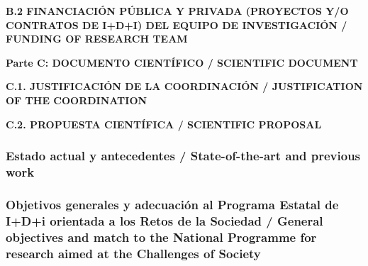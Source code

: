 \documentclass[a4paper,11pt,oneside]{article}
\begin{document}
\noindent\textbf{B.2 FINANCIACIÓN PÚBLICA Y PRIVADA (PROYECTOS Y/O CONTRATOS DE I+D+I) DEL EQUIPO DE INVESTIGACIÓN / FUNDING OF RESEARCH TEAM}
\vspace{12pt}


\newpage
\setcounter{page}{1}



\begin{tcolorbox}[colback=yellow,arc=0pt,outer arc=0pt,colframe=black,boxrule=0.6pt,left=0mm]
  \noindent\textbf{Parte C: DOCUMENTO CIENTÍFICO / SCIENTIFIC DOCUMENT}
\end{tcolorbox}

\vspace{12pt}

\noindent\textbf{C.1. JUSTIFICACIÓN DE LA COORDINACIÓN / JUSTIFICATION OF THE COORDINATION}
\vspace{12pt}



\vspace{12pt}

\noindent\textbf{C.2. PROPUESTA CIENTÍFICA / SCIENTIFIC PROPOSAL}

\subsubsection*{\label{subsubsec:stateoftheart}Estado actual y antecedentes /  State-of-the-art and previous work}




\subsubsection*{Objetivos generales y adecuación al Programa Estatal de I+D+i orientada a los Retos de la Sociedad / General objectives and match to the National Programme for research aimed at the Challenges of Society}
\end{document}
